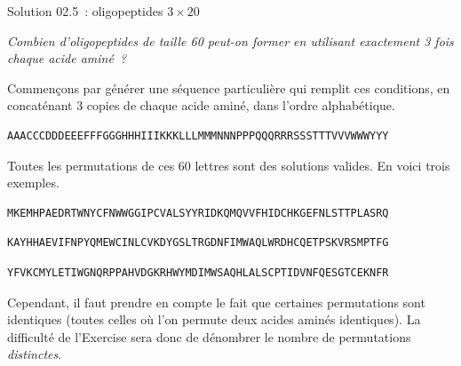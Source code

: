 \documentclass[ignorenonframetext,]{beamer}
\begin{document}
\begin{frame}[fragile]{Solution 02.5~: oligopeptides \(3 \times 20\)}
\protect\hypertarget{solution-02.5-oligopeptides-3-times-20}{}

\emph{Combien d'oligopeptides de taille 60 peut-on former en utilisant
exactement 3 fois chaque acide aminé~?}

Commençons par générer une séquence particulière qui remplit ces
conditions, en concaténant 3 copies de chaque acide aminé, dans l'ordre
alphabétique.

\begin{verbatim}
AAACCCDDDEEEFFFGGGHHHIIIKKKLLLMMMNNNPPPQQQRRRSSSTTTVVVWWWYYY
\end{verbatim}

Toutes les permutations de ces 60 lettres sont des solutions valides. En
voici trois exemples.

\begin{verbatim}
MKEMHPAEDRTWNYCFNWWGGIPCVALSYYRIDKQMQVVFHIDCHKGEFNLSTTPLASRQ
\end{verbatim}

\begin{verbatim}
KAYHHAEVIFNPYQMEWCINLCVKDYGSLTRGDNFIMWAQLWRDHCQETPSKVRSMPTFG
\end{verbatim}

\begin{verbatim}
YFVKCMYLETIWGNQRPPAHVDGKRHWYMDIMWSAQHLALSCPTIDVNFQESGTCEKNFR
\end{verbatim}

Cependant, il faut prendre en compte le fait que certaines permutations
sont identiques (toutes celles où l'on permute deux acides aminés
identiques). La difficulté de l'Exercise sera donc de dénombrer le
nombre de permutations \emph{distinctes}.

\end{frame}
\end{document}

